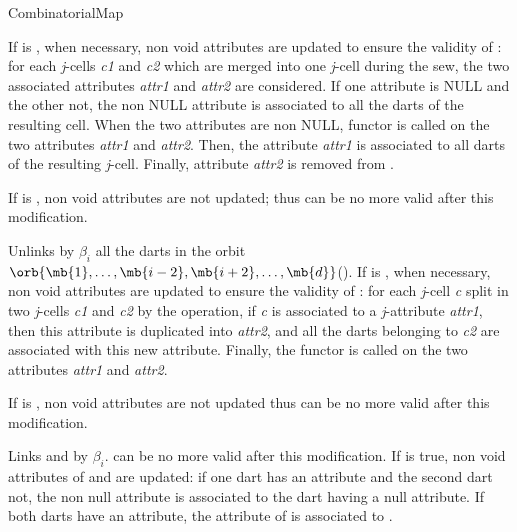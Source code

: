 \begin{ccRefConcept}{CombinatorialMap}
{  If  is , when necessary, non void
  attributes are updated to ensure the validity of : for each
  \emph{j}-cells \emph{c1} and \emph{c2} which are merged into one \emph{j}-cell during
  the sew, the two associated attributes \emph{attr1} and \emph{attr2} are
  considered.  If one attribute is
  NULL and the other not, the non NULL attribute is associated to all
  the darts of the resulting cell.  When the two attributes are non
  NULL, functor  is called on
  the two attributes \emph{attr1} and \emph{attr2}. Then, the attribute
  \emph{attr1} is associated to all darts of the resulting
  \emph{j}-cell. Finally, attribute \emph{attr2} is removed from .
  \begin{ccAdvanced}
    If  is , non void attributes are
    not updated; thus  can be no more valid after this
    modification.
  \end{ccAdvanced}
}

 {Unlinks by $\beta_i$ all the darts in the
  orbit
  $\orb{\mb{1},\ldots,\mb{i-2},\mb{i+2},\ldots,\mb{d}}$().  If
   is , when necessary, non void
  attributes are updated to ensure the validity of : for each
  \emph{j}-cell \emph{c} split in two \emph{j}-cells \emph{c1} and \emph{c2} by the
  operation, if \emph{c} is associated to a \emph{j}-attribute \emph{attr1}, then
  this attribute is duplicated into \emph{attr2}, and all the darts
  belonging to \emph{c2} are associated with this new attribute.  Finally,
  the functor  is called on the
  two attributes \emph{attr1} and \emph{attr2}.
\begin{ccAdvanced}
  If  is , non void attributes are
  not updated thus  can be no more valid after this
  modification. 
\end{ccAdvanced}}

\begin{ccAdvanced}

{Links  and   by $\beta_i$. 
   can be no more valid after this modification.  If
   is true, non void attributes of  and
   are updated: if one dart has an attribute and the second
  dart not, the non null attribute is associated to the dart having a null attribute. 
  If both darts have an attribute, 
  the attribute of  is associated to .
  }



\end{ccAdvanced}
\end{ccRefConcept}
